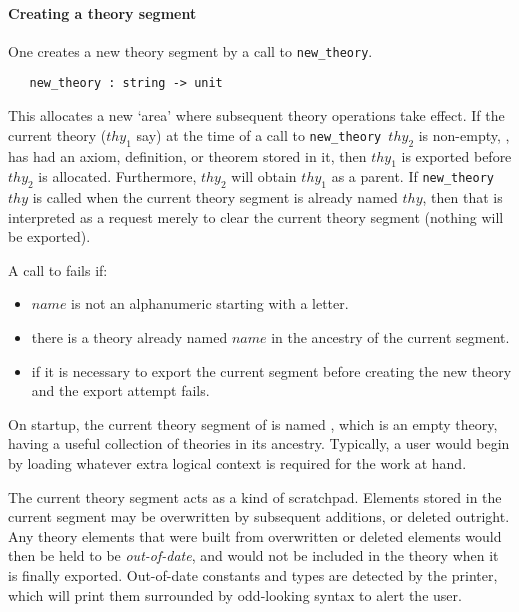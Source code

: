\paragraph{Creating a theory segment}


One creates a new theory segment by a call to \verb+new_theory+.
%
\begin{boxed}
\begin{verbatim}
   new_theory : string -> unit
\end{verbatim}
\end{boxed}
%
This allocates a new `area' where subsequent theory
operations take effect. If the current theory ($thy_1$ say) at the time
of a call to {\small\verb+new_theory +}$thy_2$ is non-empty, \ie, has
had an axiom, definition, or theorem stored in it, then $thy_1$ is
exported before $thy_2$ is allocated. Furthermore, $thy_2$ will obtain
$thy_1$ as a parent. If {\small\verb+new_theory +}$thy$ is called when
the current theory segment is already named $thy$, then that is
interpreted as a request merely to clear the current theory segment
(nothing will be exported).

A call to  fails if:
\begin{itemize}
\item $name$ is not an alphanumeric starting with a letter.

\item there is a theory already named $name$ in the ancestry of the
current segment.

\item if it is necessary to export the current segment before creating
the new theory and the export attempt fails.
\end{itemize}

On startup, the current theory segment of \HOL{} is named ,
which is an empty theory, having a useful collection of theories in
its ancestry. Typically, a user would begin by loading whatever extra
logical context is required for the work at hand.

The current theory segment acts as a kind of scratchpad. Elements stored
in the current segment may be overwritten by subsequent additions, or
deleted outright. Any theory elements that were built from overwritten
or deleted elements would then be held to be {\it out-of-date}, and would not
be included in the theory when it is finally exported.  Out-of-date
constants and types are detected by the \HOL{} printer, which will print
them surrounded by odd-looking syntax to alert the user.

